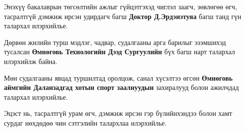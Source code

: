 
\begin{acknowledgements}
\addchaptertocentry{\acknowledgementname}

Энэхүү бакалаврын төгсөлтийн ажлыг гүйцэтгэхэд чиглэл заагч, зөвлөгөө өгч, тасралтгүй дэмжиж ирсэн удирдагч багш \textbf{Доктор Д.Эрдэнэтуяа} багш танд гүн талархал илэрхийлье.

Дөрвөн жилийн турш мэдлэг, чадвар, судалгааны арга барилыг эзэмшихэд тусалсан \textbf{Өмнөговь Технологийн Дээд Сургуулийн} бүх багш нарт талархал илэрхийлж байна.

Мөн судалгааны явцад туршилтад оролцож, санал хүсэлтээ өгсөн \textbf{Өмнөговь аймгийн Даланзадгад хотын спорт заалнуудын} захиралууд болон ажилчдад талархал илэрхийлье.

Эцэст нь, тасралтгүй урам өгч, дэмжиж ирсэн гэр бүлийнхэндээ болон хамт сурдаг нөхдөдөө чин сэтгэлийн талархлаа илэрхийлье.

\end{acknowledgements}

